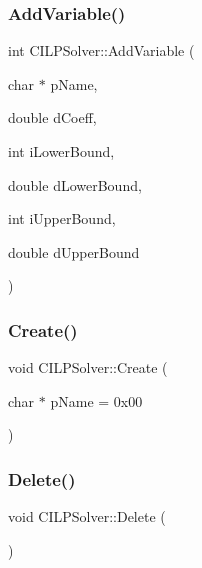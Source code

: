 \mbox{\label{classCILPSolver_afd9a2ce4366c08b46c70c14edc3fe140}} 
\subsubsection{\texorpdfstring{AddVariable()}{AddVariable()}}
{\footnotesize\ttfamily int C\+I\+L\+P\+Solver\+::\+Add\+Variable (\begin{DoxyParamCaption}\item[{char $\ast$}]{p\+Name,  }\item[{double}]{d\+Coeff,  }\item[{int}]{i\+Lower\+Bound,  }\item[{double}]{d\+Lower\+Bound,  }\item[{int}]{i\+Upper\+Bound,  }\item[{double}]{d\+Upper\+Bound }\end{DoxyParamCaption})}

\mbox{\label{classCILPSolver_ade3a95ce07777f2eff2b4e2fd4b7d8a1}} 
\subsubsection{\texorpdfstring{Create()}{Create()}}
{\footnotesize\ttfamily void C\+I\+L\+P\+Solver\+::\+Create (\begin{DoxyParamCaption}\item[{char $\ast$}]{p\+Name = {\ttfamily 0x00} }\end{DoxyParamCaption})}

\mbox{\label{classCILPSolver_a470b31f458be6d7584828e7656f65f75}} 
\subsubsection{\texorpdfstring{Delete()}{Delete()}}
{\footnotesize\ttfamily void C\+I\+L\+P\+Solver\+::\+Delete (\begin{DoxyParamCaption}{ }\end{DoxyParamCaption})}

\mbox{\label{classCILPSolver_a17d4b786fa8f12b2dc51e8d53d75fc4b}} 
